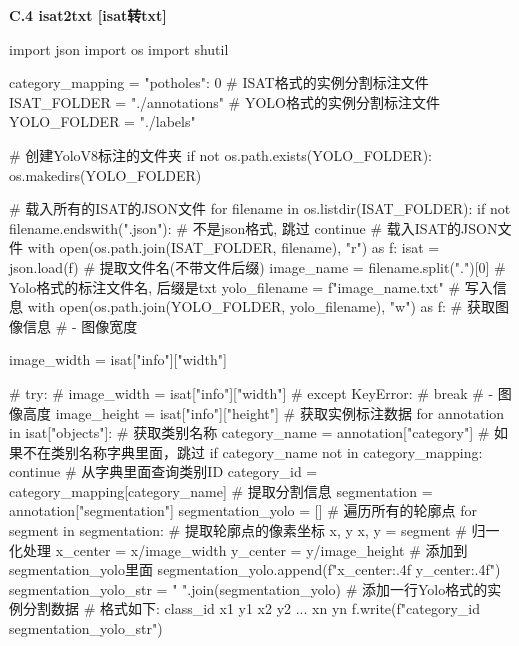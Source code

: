\documentclass{MathorCupmodeling}
\begin{document}
\textbf{C.4 isat2txt [isat转txt]}
\begin{python}
import json
import os
import shutil

category_mapping = {"potholes": 0}
# ISAT格式的实例分割标注文件
ISAT_FOLDER = "./annotations"
# YOLO格式的实例分割标注文件
YOLO_FOLDER = "./labels"

# 创建YoloV8标注的文件夹
if not os.path.exists(YOLO_FOLDER):
    os.makedirs(YOLO_FOLDER)


# 载入所有的ISAT的JSON文件
for filename in os.listdir(ISAT_FOLDER):
    if not filename.endswith(".json"):
        # 不是json格式, 跳过
        continue
    # 载入ISAT的JSON文件
    with open(os.path.join(ISAT_FOLDER, filename), "r") as f:
        isat = json.load(f)
    # 提取文件名(不带文件后缀)
    image_name = filename.split(".")[0]
    # Yolo格式的标注文件名, 后缀是txt
    yolo_filename = f"{image_name}.txt"
    # 写入信息
    with open(os.path.join(YOLO_FOLDER, yolo_filename), "w") as f:
        # 获取图像信息
        # - 图像宽度

        image_width = isat["info"]["width"]

        # try:
        #     image_width = isat["info"]["width"]
        # except KeyError:
        #     break
        # - 图像高度
        image_height = isat["info"]["height"]
        # 获取实例标注数据
        for annotation in isat["objects"]:
            # 获取类别名称
            category_name = annotation["category"]
            # 如果不在类别名称字典里面，跳过
            if category_name not in category_mapping:
                continue
            # 从字典里面查询类别ID
            category_id = category_mapping[category_name]
            # 提取分割信息
            segmentation = annotation["segmentation"]
            segmentation_yolo = []
            # 遍历所有的轮廓点
            for segment in segmentation:
                # 提取轮廓点的像素坐标 x, y
                x, y = segment
                # 归一化处理
                x_center = x/image_width
                y_center = y/image_height
                # 添加到segmentation_yolo里面
                segmentation_yolo.append(f"{x_center:.4f} {y_center:.4f}")
            segmentation_yolo_str = " ".join(segmentation_yolo)
            # 添加一行Yolo格式的实例分割数据
            # 格式如下: class_id x1 y1 x2 y2 ... xn yn\n
            f.write(f"{category_id} {segmentation_yolo_str}\n")
\end{python}
\end{document}
